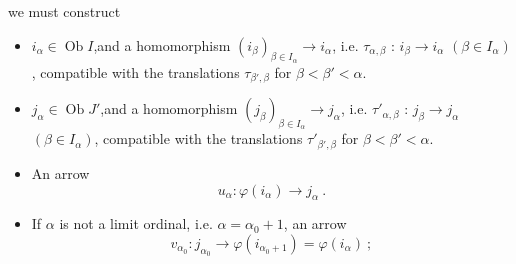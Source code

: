 \documentclass[11pt]{article}
\newcommand{\printedpage}[1]{\marginpar{\footnotesize p.~#1}}
\newcommand{\msp}[1]{\marginpar{\footnotesize [#1]}}
\newcommand{\Ob}{\operatorname{Ob}}
\begin{document}
\msp{page 317}

we must construct

\printedpage{120}
\begin{itemize}[leftmargin=*]
\item[1)] $i_\alpha\in\Ob I$,\quad and a homomorphism $(i_\beta)_{\beta\in I_\alpha}\longrightarrow i_\alpha$, i.e. $\tau_{\alpha,\beta}$ : $i_\beta\longrightarrow i_\alpha$ $(\beta\in I_\alpha)$, compatible with the translations $\tau_{\beta',\beta}$ for $\beta<\beta'<\alpha$.
\item[2)] $j_\alpha\in\Ob J'$,\quad and a homomorphism $(j_\beta)_{\beta\in I_\alpha}\longrightarrow j_\alpha$, i.e. $\tau'_{\alpha,\beta}$ : $j_\beta\longrightarrow j_\alpha$ $(\beta\in I_\alpha)$, compatible with the translations $\tau'_{\beta',\beta}$ for $\beta<\beta'<\alpha$.
\item[3)] An arrow
\[
u_\alpha:\varphi(i_\alpha)\longrightarrow j_\alpha\ .
\]
\item[4)] If $\alpha$ is not a limit ordinal, i.e. $\alpha=\alpha_0+1$, an arrow
\[
v_{\alpha_0}:j_{\alpha_0}\longrightarrow\varphi(i_{\alpha_0+1})=\varphi(i_\alpha)\ ;
\]
\end{itemize}
\end{document}
